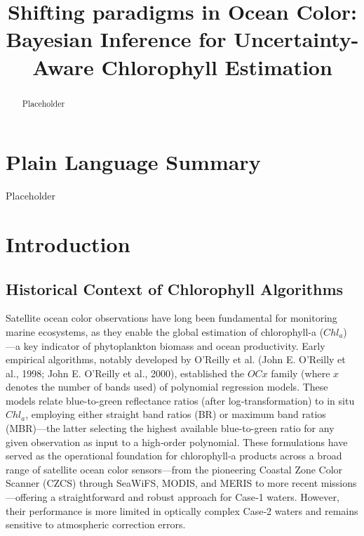 \documentclass[
]{agujournal2019}
\begin{document}
\title{Shifting paradigms in Ocean Color: Bayesian Inference for
Uncertainty-Aware Chlorophyll Estimation}



\begin{abstract}
Placeholder
\end{abstract}

\section*{Plain Language Summary}
Placeholder




\section{Introduction}\label{introduction}

\subsection{Historical Context of Chlorophyll
Algorithms}\label{historical-context-of-chlorophyll-algorithms}

Satellite ocean color observations have long been fundamental for
monitoring marine ecosystems, as they enable the global estimation of
chlorophyll‑a (\(Chl_a\)) ---a key indicator of phytoplankton biomass
and ocean productivity. Early empirical algorithms, notably developed by
O'Reilly et al. (John E. O'Reilly et al., 1998; John E. O'Reilly et al.,
2000), established the \(OCx\) family (where \(x\) denotes the number of
bands used) of polynomial regression models. These models relate
blue-to-green reflectance ratios (after log‑transformation) to in situ
\(Chl_a\), employing either straight band ratios (BR) or maximum band
ratios (MBR)---the latter selecting the highest available blue-to-green
ratio for any given observation as input to a high‑order polynomial.
These formulations have served as the operational foundation for
chlorophyll‑a products across a broad range of satellite ocean color
sensors---from the pioneering Coastal Zone Color Scanner (CZCS) through
SeaWiFS, MODIS, and MERIS to more recent missions---offering a
straightforward and robust approach for Case‑1 waters. However, their
performance is more limited in optically complex Case‑2 waters and
remains sensitive to atmospheric correction errors.
\end{document}
